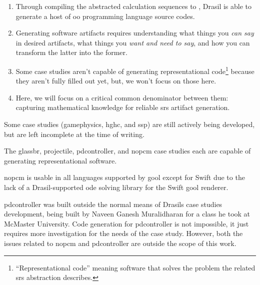 \begin{enumerate}
      \item Through compiling the abstracted calculation sequences to 
            \cite{Carette2019}, Drasil is able to generate a host of \acs{oo}
            programming language source codes.

      \item Generating software artifacts requires understanding what things you
            \textit{can say} in desired artifacts, what things you \textit{want
                  and need to say}, and how you can transform the latter into the
            former.

      \item Some case studies aren't capable of generating representational
            code\footnote{``Representational code'' meaning software that solves
                  the problem the related \acs{srs} abstraction describes.} because
            they aren't fully filled out yet, but, we won't focus on those here.

      \item Here, we will focus on a critical common denominator between them:
            capturing mathematical knowledge for reliable \acs{srs} artifact
            generation.

\end{enumerate}

\caseStudiesCodeTable{}

Some case studies (\acs{gamephysics}, \acs{hghc}, and \acs{ssp}) are still
actively being developed, but are left incomplete at the time of writing.

The \acs{glassbr}, \acs{projectile}, \acs{pdcontroller}, and \acs{nopcm} case
studies each are capable of generating representational software.

\acs{nopcm} is usable in all languages supported by \acs{gool} except for Swift
due to the lack of a Drasil-supported \acs{ode} solving library for the Swift
\acs{gool} renderer.

\acs{pdcontroller} was built outside the normal means of Drasils case studies
development, being built by Naveen Ganesh Muralidharan \cite{DrasilPR2289Naveen}
for a class he took at McMaster University. Code generation for
\acs{pdcontroller} is not impossible, it just requires more investigation for
the needs of the case study. However, both the issues related to \acs{nopcm} and
\acs{pdcontroller} are outside the scope of this work.
